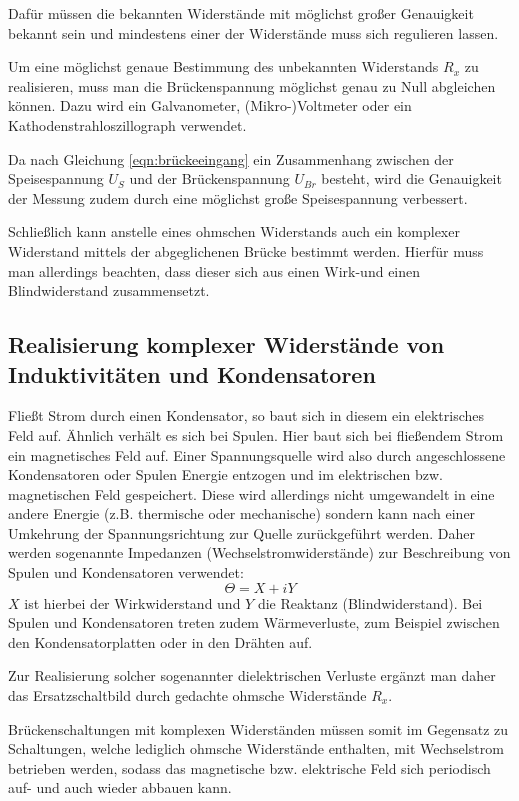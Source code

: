 Dafür müssen die bekannten Widerstände mit möglichst großer Genauigkeit bekannt sein und mindestens einer der Widerstände muss sich regulieren lassen.

Um eine möglichst genaue Bestimmung des unbekannten Widerstands $R_x$ zu realisieren, muss man die Brückenspannung möglichst genau zu Null abgleichen können.
Dazu wird ein Galvanometer, (Mikro-)Voltmeter oder ein Kathodenstrahloszillograph verwendet.

Da nach Gleichung \eqref{eqn:brückeeingang} ein Zusammenhang zwischen der Speisespannung $U_S$ und der Brückenspannung $U_{Br}$ besteht, wird die Genauigkeit der Messung zudem durch eine möglichst große Speisespannung verbessert.

Schließlich kann anstelle eines ohmschen Widerstands auch ein komplexer Widerstand mittels der abgeglichenen Brücke bestimmt werden. Hierfür muss man allerdings beachten, dass dieser sich aus einen Wirk-und einen Blindwiderstand zusammensetzt.

\subsection{Realisierung komplexer Widerstände von Induktivitäten und Kondensatoren}
\label{sec:komplexewiderstände}
Fließt Strom durch einen Kondensator, so baut sich in diesem ein elektrisches Feld auf. Ähnlich verhält es sich bei Spulen. Hier baut sich bei fließendem Strom ein magnetisches Feld auf.
Einer Spannungsquelle wird also durch angeschlossene Kondensatoren oder Spulen Energie entzogen und im elektrischen bzw. magnetischen Feld gespeichert. Diese wird allerdings nicht umgewandelt in eine andere Energie (z.B. thermische oder mechanische) sondern kann nach einer Umkehrung der Spannungsrichtung zur Quelle zurückgeführt werden.
Daher werden sogenannte Impedanzen (Wechselstromwiderstände) zur Beschreibung von Spulen und Kondensatoren verwendet:
\begin{equation}
\Theta= X+iY
\end{equation}
$X$ ist hierbei der Wirkwiderstand und $Y$ die Reaktanz (Blindwiderstand).
Bei Spulen und Kondensatoren treten zudem Wärmeverluste, zum Beispiel zwischen den Kondensatorplatten
oder in den Drähten auf.

Zur Realisierung solcher sogenannter dielektrischen Verluste
ergänzt man daher das Ersatzschaltbild durch gedachte ohmsche Widerstände $R_x$.

Brückenschaltungen mit komplexen Widerständen müssen somit im Gegensatz zu Schaltungen, welche lediglich ohmsche Widerstände enthalten, mit Wechselstrom betrieben werden, sodass das magnetische bzw. elektrische Feld sich periodisch auf- und auch wieder abbauen kann.

